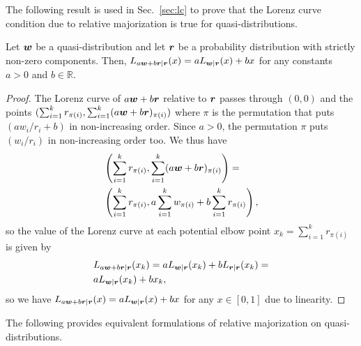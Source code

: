 \documentclass[pra,
aps,
twocolumn,
superscriptaddress,
groupedaddress,
nofootinbib,
reprint
]{revtex4-1}
\begin{document}
The following result is used in Sec.~\ref{sec:lc} to prove that the Lorenz curve condition due to relative majorization is true for quasi-distributions.
\begin{proposition}\label{Lorenz_linearity}
	Let $\boldsymbol{w}$ be a quasi-distribution and let $\boldsymbol{r}$ be a probability distribution with strictly non-zero components. 
	Then, $L_{a\boldsymbol{w} + b \boldsymbol{r} | \boldsymbol{r}} (x) = a L_{\boldsymbol{w} |\boldsymbol{r}}(x) + b x$ for any constants $a > 0$ and $b \in \mathbb{R}$.
\end{proposition}
\begin{proof} 
	The Lorenz curve of $a\boldsymbol{w} + b \boldsymbol{r}$ relative to $\boldsymbol{r}$ passes through $(0,0)$ and the points $(\sum_{i=1}^k{r_{\pi(i)}}, \sum_{i=1}^k(a \boldsymbol{w} + b \boldsymbol{r})_{\pi(i)})$ where $\pi$ is the permutation that puts $(a w_i/r_i + b)$ in non-increasing order. Since $a > 0$, the permutation $\pi$ puts  $(w_i/r_i)$ in non-increasing order too. We thus have
\begin{align*}
&\left( \sum_{i=1}^k r_{\pi(i)}, \sum_{i=1}^k(a \boldsymbol{w} + b \boldsymbol{r})_{\pi(i)} \right) = \\ 
&\left( \sum_{i=1}^k r_{\pi(i)},a \sum_{i=1}^k  w_{\pi(i)} + b\sum_{i=1}^k r_{\pi(i)} \right) \nonumber,
\end{align*}
so the value of the Lorenz curve at each potential elbow point $x_k = \sum_{i=1} ^kr_{\pi(i)}$ is given by
\begin{align}
&L_{a \boldsymbol{w} +b \boldsymbol{r}|\boldsymbol{r}} (x_k) = a L_{\boldsymbol{w}|\boldsymbol{r}} (x_k) + b L_{\boldsymbol{r}|\boldsymbol{r}}(x_k) = \nonumber\\
&a L_{\boldsymbol{w}|\boldsymbol{r}} (x_k) + b x_k,
\end{align}
so we have $L_{a\boldsymbol{w}  + b\boldsymbol{r}|\boldsymbol{r}} (x) = a L_{\boldsymbol{w} |\boldsymbol{r}}(x) + b x$ for any $x \in [0,1]$ due to linearity.
\end{proof}
	
The following provides equivalent formulations of relative majorization on quasi-distributions. 
\end{document}
